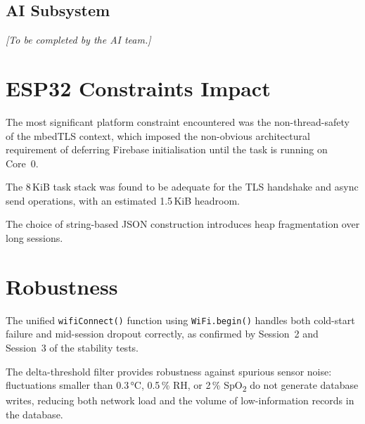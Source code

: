 \subsection{AI Subsystem}
\begin{center}
	\textit{[To be completed by the AI team.]}
\end{center}

\section{ESP32 Constraints Impact}

The most significant platform constraint encountered was the non-thread-safety of
the mbedTLS context, which imposed the non-obvious architectural requirement of
deferring Firebase initialisation until the task is running on Core~0.

The 8\,KiB task stack was found to be adequate for the TLS handshake and async send
operations, with an estimated 1.5\,KiB headroom.

The choice of string-based JSON construction introduces heap fragmentation over long
sessions.

\section{Robustness}

The unified \texttt{wifiConnect()} function using \texttt{WiFi.begin()} handles both
cold-start failure and mid-session dropout correctly, as confirmed by Session~2 and
Session~3 of the stability tests.

The delta-threshold filter provides robustness against spurious sensor noise:
fluctuations smaller than 0.3\,°C, 0.5\,\% RH, or 2\,\% SpO\textsubscript{2} do
not generate database writes, reducing both network load and the volume of
low-information records in the database.

